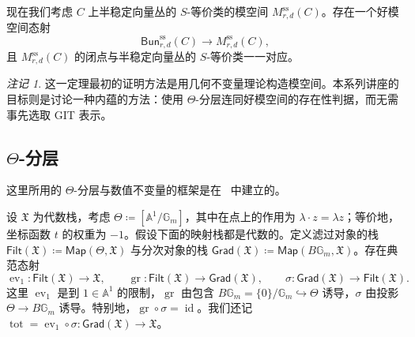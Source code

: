 \documentclass{amsart}
\theoremstyle{definition}
\theoremstyle{remark}
\newtheorem{rmk}[thm]{注记}
\theoremstyle{plain}
\theoremstyle{definition}
\theoremstyle{remark}
\newcommand{\A}{\mathbb{A}}
\newcommand{\G}{\mathbb{G}}
\newcommand{\mf}[1]{\mathfrak{#1}}
\newcommand{\mr}[1]{\mathrm{#1}}
\newcommand{\on}[1]{\operatorname{#1}}
\newcommand{\ms}[1]{\mathsf{#1}}
\newcommand{\1}{\mathbf{1}}
\newcommand{\2}{\mathbf{2}}
\newcommand{\3}{\mathbf{3}}
\DeclareMathOperator{\ev}{ev}
\begin{document}
现在我们考虑 \(C\) 上半稳定向量丛的 \(S\)-等价类的模空间 \(M_{r,d}^{\mr{ss}}(C)\)。存在一个好模空间态射
\[
    \ms{Bun}_{r,d}^{\mr{ss}}(C)\longrightarrow M_{r,d}^{\mr{ss}}(C),
\]
且 \(M_{r,d}^{\mr{ss}}(C)\) 的闭点与半稳定向量丛的 \(S\)-等价类一一对应。

\begin{rmk}
    这一定理最初的证明方法是用几何不变量理论构造模空间。本系列讲座的目标则是讨论一种内蕴的方法：使用 \(\Theta\)-分层连同好模空间的存在性判据，而无需事先选取 GIT 表示。
\end{rmk}


\subsection{\(\Theta\)-分层}%
\label{sub:Theta-stratifications}

这里所用的 \(\Theta\)-分层与数值不变量的框架是在~\cite{HLinstability} 中建立的。

设 \(\mf{X}\) 为代数栈，考虑 \(\Theta\coloneqq[\A^1/\G_m]\)，其中在点上的作用为 \(\lambda\cdot z=\lambda z\)；等价地，坐标函数 \(t\) 的权重为 \(-1\)。假设下面的映射栈都是代数的。定义滤过对象的栈 \(\ms{Filt}(\mf{X})\coloneqq\ms{Map}(\Theta,\mf{X})\) 与分次对象的栈 \(\ms{Grad}(\mf{X})\coloneqq\ms{Map}(B\G_m,\mf{X})\)。存在典范态射
\[
    \ev_1\colon\ms{Filt}(\mf{X})\to\mf{X},
    \qquad
    \on{gr}\colon\ms{Filt}(\mf{X})\to\ms{Grad}(\mf{X}),
    \qquad
    \sigma\colon\ms{Grad}(\mf{X})\to\ms{Filt}(\mf{X}).
\]
这里 \(\ev_1\) 是到 \(1\in\A^1\) 的限制，\(\on{gr}\) 由包含 \(B\G_m=\{0\}/\G_m\hookrightarrow\Theta\) 诱导，\(\sigma\) 由投影 \(\Theta\to B\G_m\) 诱导。特别地，\(\on{gr}\circ\sigma=\on{id}\)。我们还记 \(\on{tot}=\ev_1\circ\sigma\colon\ms{Grad}(\mf{X})\to\mf{X}\)。
\end{document}
